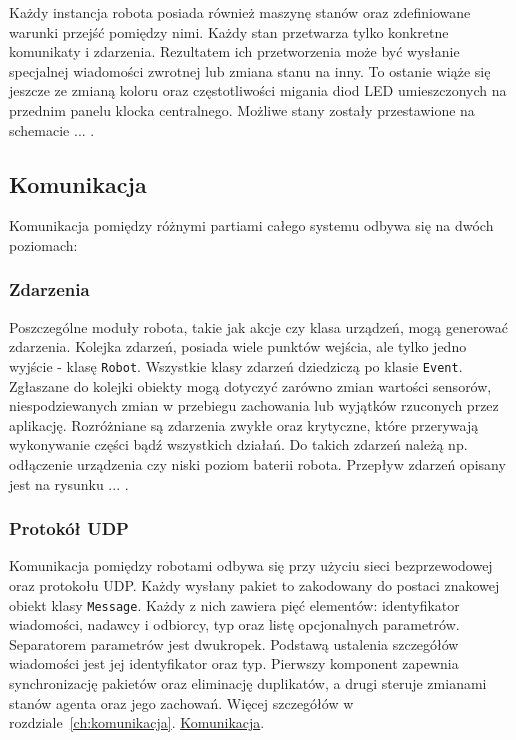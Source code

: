 Każdy instancja robota posiada również maszynę stanów oraz zdefiniowane warunki przejść pomiędzy nimi. Każdy stan przetwarza tylko konkretne komunikaty i zdarzenia. Rezultatem ich przetworzenia może być wysłanie specjalnej wiadomości zwrotnej lub zmiana stanu na inny. To ostanie wiąże się jeszcze ze zmianą koloru oraz częstotliwości migania diod LED umieszczonych na przednim panelu klocka centralnego. Możliwe stany zostały przestawione na schemacie ... .


\subsection{Komunikacja}

\indent \indent Komunikacja pomiędzy różnymi partiami całego systemu odbywa się na dwóch poziomach:

\subsubsection{Zdarzenia}

Poszczególne moduły robota, takie jak akcje czy klasa urządzeń, mogą generować zdarzenia. Kolejka zdarzeń, posiada wiele punktów wejścia, ale tylko jedno wyjście - klasę {\tt Robot}. Wszystkie klasy zdarzeń dziedziczą po klasie {\tt Event}. Zgłaszane do kolejki obiekty mogą dotyczyć zarówno zmian wartości sensorów, niespodziewanych zmian w przebiegu zachowania lub wyjątków rzuconych przez aplikację. Rozróżniane są zdarzenia zwykłe oraz krytyczne, które przerywają wykonywanie części bądź wszystkich działań. Do takich zdarzeń należą np. odłączenie urządzenia czy niski poziom baterii robota. Przepływ zdarzeń opisany jest na rysunku ... .


\subsubsection{Protokół UDP}

Komunikacja pomiędzy robotami odbywa się przy użyciu sieci bezprzewodowej oraz protokołu UDP. Każdy wysłany pakiet to zakodowany do postaci znakowej obiekt klasy {\tt Message}. Każdy z nich zawiera pięć elementów: identyfikator wiadomości, nadawcy i odbiorcy, typ oraz listę opcjonalnych parametrów. Separatorem parametrów jest dwukropek. Podstawą ustalenia szczegółów wiadomości jest jej identyfikator oraz typ. Pierwszy komponent zapewnia synchronizację pakietów oraz eliminację duplikatów, a drugi steruje zmianami stanów agenta oraz jego zachowań. Więcej szczegółów w rozdziale~\ref{ch:komunikacja}. \hyperref[ch:komunikacja]{Komunikacja}.

